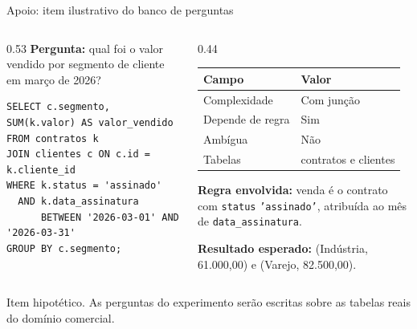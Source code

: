 \documentclass[aspectratio=169,10pt]{beamer}
\newcommand{\cab}[1]{\textcolor{UnBAzul}{\textbf{#1}}}
\begin{document}
\begin{frame}[fragile]{Apoio: item ilustrativo do banco de perguntas}
  \begin{columns}[T,onlytextwidth]
    \begin{column}{0.53\textwidth}
      \textbf{Pergunta:} qual foi o valor vendido por segmento de cliente em março de 2026?
      \vspace{1mm}
\begin{lstlisting}
SELECT c.segmento, SUM(k.valor) AS valor_vendido
FROM contratos k
JOIN clientes c ON c.id = k.cliente_id
WHERE k.status = 'assinado'
  AND k.data_assinatura
      BETWEEN '2026-03-01' AND '2026-03-31'
GROUP BY c.segmento;
\end{lstlisting}
    \end{column}
    \begin{column}{0.44\textwidth}
      \small
      \begin{tabular}{@{}ll@{}}
        \toprule
        \cab{Campo} & \cab{Valor}\\
        \midrule
        Complexidade & Com junção\\
        Depende de regra & Sim\\
        Ambígua & Não\\
        Tabelas & contratos e clientes\\
        \bottomrule
      \end{tabular}

      \vspace{2mm}
      \textbf{Regra envolvida:} venda é o contrato com \texttt{status} \texttt{'assinado'},
      atribuída ao mês de \texttt{data\_assinatura}.

      \vspace{2mm}
      \textbf{Resultado esperado:} (Indústria, 61.000,00) e (Varejo, 82.500,00).
    \end{column}
  \end{columns}
  \vspace{2mm}
  {\scriptsize\color{UnBCinza}Item hipotético. As perguntas do experimento serão escritas sobre as tabelas reais do domínio comercial.}
\end{frame}
\end{document}
